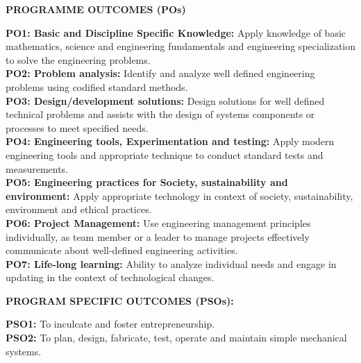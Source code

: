 \begin{center}
  \vspace{3mm}
  {\fontsize{12}{15}\selectfont \bfseries \textcolor{navyblue}{PROGRAMME OUTCOMES (POs)}}\\[2mm]
\end{center}
\noindent
\textbf{PO1: Basic and Discipline Specific Knowledge:} Apply knowledge of basic mathematics, science and engineering fundamentals and engineering specialization to solve the engineering problems.\\[1.5mm]
\textbf{PO2: Problem analysis:} Identify and analyze well defined engineering problems using codified standard methods.\\[1.5mm]
\textbf{PO3: Design/development solutions:} Design solutions for well defined technical problems and assists with the design of systems components or processes to meet specified needs.\\[1.5mm]
\textbf{PO4: Engineering tools, Experimentation and testing:} Apply modern engineering tools and appropriate technique to conduct standard tests and measurements.\\[1.5mm]
\textbf{PO5: Engineering practices for Society, sustainability and environment:} Apply appropriate technology in context of society, sustainability, environment and ethical practices.\\[1.5mm]
\textbf{PO6: Project Management:} Use engineering management principles individually, as team member or a leader to manage projects effectively communicate about well-defined engineering activities.\\[1.5mm]
\textbf{PO7: Life-long learning:} Ability to analyze individual needs and engage in updating in the context of technological changes.

\begin{center}
  \vspace{3mm}
  {\fontsize{12}{15}\selectfont \bfseries \textcolor{navyblue}{PROGRAM SPECIFIC OUTCOMES (PSOs):}}\\[2mm]
\end{center}
\noindent
\textbf{PSO1:} To inculcate and foster entrepreneurship.\\[1.5mm]
\textbf{PSO2:} To plan, design, fabricate, test, operate and maintain simple mechanical systems.
\clearpage
